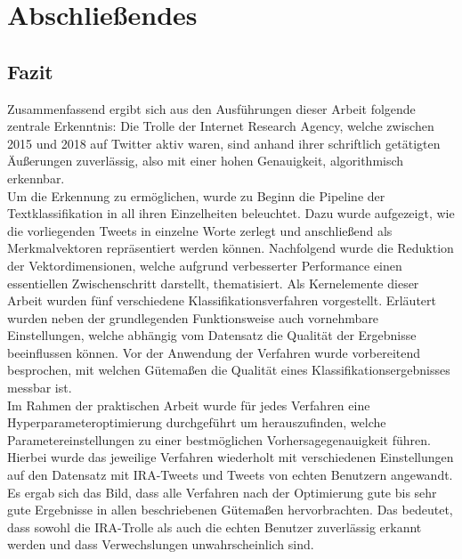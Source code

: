 \section{Abschließendes}\raggedbottom
\subsection{Fazit}
Zusammenfassend ergibt sich aus den Ausführungen dieser Arbeit folgende zentrale Erkenntnis: Die Trolle der Internet Research Agency, welche zwischen 2015 und 2018 auf Twitter aktiv waren, sind anhand ihrer schriftlich getätigten Äußerungen zuverlässig, also mit einer hohen Genauigkeit, algorithmisch erkennbar.\\
Um die Erkennung zu ermöglichen, wurde zu Beginn die Pipeline der Textklassifikation in all ihren Einzelheiten beleuchtet. Dazu wurde aufgezeigt, wie die vorliegenden Tweets in einzelne Worte zerlegt und anschließend als Merkmalvektoren repräsentiert werden können. Nachfolgend wurde die Reduktion der Vektordimensionen, welche aufgrund verbesserter Performance einen essentiellen Zwischenschritt darstellt, thematisiert. Als Kernelemente dieser Arbeit wurden fünf verschiedene Klassifikationsverfahren vorgestellt. Erläutert wurden neben der grundlegenden Funktionsweise auch vornehmbare Einstellungen, welche abhängig vom Datensatz die Qualität der Ergebnisse beeinflussen können. Vor der Anwendung der Verfahren wurde vorbereitend besprochen, mit welchen Gütemaßen die Qualität eines Klassifikationsergebnisses messbar ist.\\
Im Rahmen der praktischen Arbeit wurde für jedes Verfahren eine Hyperparameteroptimierung durchgeführt um herauszufinden, welche Parametereinstellungen zu einer bestmöglichen Vorhersagegenauigkeit führen. Hierbei wurde das jeweilige Verfahren wiederholt mit verschiedenen Einstellungen auf den Datensatz mit IRA-Tweets und Tweets von echten Benutzern angewandt. Es ergab sich das Bild, dass alle Verfahren nach der Optimierung gute bis sehr gute Ergebnisse in allen beschriebenen Gütemaßen hervorbrachten. Das bedeutet, dass sowohl die IRA-Trolle als auch die echten Benutzer zuverlässig erkannt werden und dass Verwechslungen unwahrscheinlich sind.
